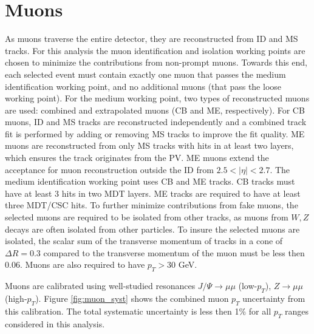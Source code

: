 \section{Muons}
As muons traverse the entire detector, they are reconstructed from ID and MS tracks. For this analysis the muon identification and isolation working points are chosen to minimize the contributions from non-prompt muons. Towards this end, each selected event must contain exactly one muon that passes the medium identification working point, and no additional muons (that pass the loose working point). For the medium working point, two types of reconstructed muons are used: combined and extrapolated muons (CB and ME, respectively). For CB muons, ID and MS tracks are reconstructed independently and a combined track fit is performed by adding or removing MS tracks to improve the fit quality. ME muons are reconstructed from only MS tracks with hits in at least two layers, which ensures the track originates from the PV. ME muons extend the acceptance for muon reconstruction outside the ID from $2.5 < |\eta| < 2.7$.
The medium identification working point uses CB and ME tracks. CB tracks must have at least 3 hits in two MDT layers. ME tracks are required to have at least three MDT/CSC hits. To further minimize contributions from fake muons, the selected muons are required to be isolated from other tracks, as muons from $W,Z$ decays are often isolated from other particles. To insure the selected muons are isolated, the scalar sum of the transverse momentum of tracks in a cone of $\Delta R = 0.3$ compared to the transverse momentum of the muon must be less then 0.06. Muons are also required to have $p_{T} > 30$ GeV.

Muons are calibrated using well-studied resonances $J/ \Psi \rightarrow \mu \mu$ (low-$p_T$),  $Z \rightarrow \mu \mu$ (high-$p_{T}$). Figure \ref{fig:muon_syst} shows the combined muon $p_{T}$ uncertainty from this calibration. The total systematic uncertainty is less then 1\% for all $p_{T}$ ranges considered in this analysis.


